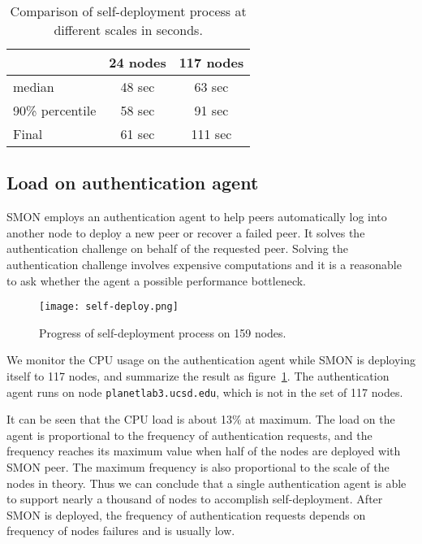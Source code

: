 \begin{table}
\centering
\begin{tabular}{|l|c|c|}
\hline
  & 24 nodes & 117 nodes\\
\hline
median & 48 sec & 63 sec \\
\hline
90\% percentile & 58 sec & 91 sec\\
\hline
Final & 61 sec & 111 sec\\
\hline
\end{tabular}
\caption{Comparison of self-deployment process at different
scales in seconds.}
\label{tbl:scalability}
\end{table}

\subsection{Load on authentication agent}

SMON employs an authentication agent to help peers
automatically log into another node to deploy a new peer or
recover a failed peer. It solves the authentication
challenge on behalf of the requested peer. Solving the
authentication challenge involves expensive computations and
it is a reasonable to ask whether the agent a possible
performance bottleneck.

\begin{figure}%
\centering
\texttt{[image: self-deploy.png]}
\caption{Progress of self-deployment process on 159
nodes.}
\label{fig:agentload}
\end{figure}

We monitor the CPU usage on the authentication agent while
SMON is deploying itself to 117 nodes, and summarize the
result as figure~\ref{fig:agentload}. The authentication
agent runs on node \texttt{planetlab3.ucsd.edu}, which is
not in the set of 117 nodes.

It can be seen that the CPU load is about 13\% at maximum.
The load on the agent is proportional to the frequency of
authentication requests, and the frequency reaches its
maximum value when half of the nodes are deployed with SMON
peer. The maximum frequency is also proportional to the
scale of the nodes in theory. Thus we can conclude that a
single authentication agent is able to support nearly a
thousand of nodes to accomplish self-deployment. After SMON
is deployed, the frequency of authentication requests
depends on frequency of nodes failures and is usually low.

